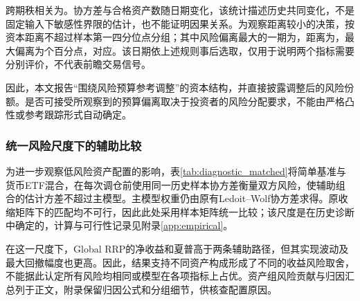 跨期秩相关为\trackingRiskCorrelation{}。协方差与合格资产数随日期变化，该统计描述历史共同变化，不是固定输入下敏感性界限的估计，也不能证明因果关系。为观察距离较小的决策，按资本距离不超过样本第一四分位点\trackingLowThreshold{}分组；其中风险偏离最大的一期为\trackingExampleDate{}，距离为\trackingExampleDistance{}，最大偏离为\trackingExampleError{}个百分点，对应\trackingExampleAsset{}。该日期依上述规则事后选取，仅用于说明两个指标需要分别评价，不代表前瞻交易信号。

因此，本文报告“围绕风险预算参考调整”的资本结构，并直接披露调整后的风险份额。是否可接受所观察到的预算偏离取决于投资者的风险分配要求，不能由严格凸性或参考跟踪形式自动确定。

\subsubsection{统一风险尺度下的辅助比较}
为进一步观察低风险资产配置的影响，表\ref{tab:diagnostic_matched}将简单基准与货币ETF混合，在每次调仓前使用同一历史样本协方差衡量双方风险，使辅助组合的估计方差不超过主模型。主模型权重仍由原有Ledoit--Wolf协方差求得。原收缩矩阵下的匹配均不可行，因此此处采用样本矩阵统一比较；该尺度是在历史诊断中确定的，计算与可行性记录见附录\ref{app:empirical}。
\begin{table}[htbp]\centering
\caption{指定事前风险尺度下的辅助比较}\label{tab:diagnostic_matched}
\fitthesistable{}
\end{table}

在这一尺度下，Global RRP的净收益和夏普高于两条辅助路径，但其实现波动及最大回撤幅度也更高。因此，结果支持不同资产构成形成了不同的收益风险取舍，不能据此认定所有风险均相同或模型在各项指标上占优。资产组风险贡献与归因汇总列于正文，附录保留归因公式和分组细节，供核查配置原因。
\FloatBarrier
